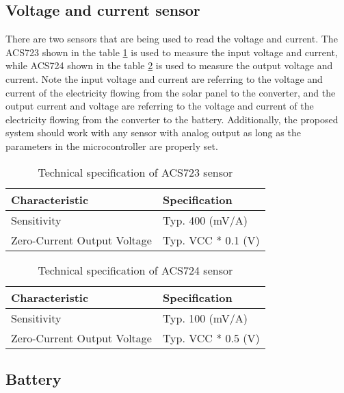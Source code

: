 \documentclass[../thesis.tex]{subfiles}
\begin{document}
\subsection{Voltage and current sensor}

There are two sensors that are being used to read the voltage and current. The ACS723 shown in the table \ref{tab:acs723} is used to measure the input voltage and current, while ACS724 shown in the table \ref{tab:acs724} is used to measure the output voltage and current. Note the input voltage and current are referring to the voltage and current of the electricity flowing from the solar panel to the converter, and the output current and voltage are referring to the voltage and current of the electricity flowing from the converter to the battery. Additionally, the proposed system should work with any sensor with analog output as long as the parameters in the microcontroller are properly set.

\begin{table}[h!]
	\begin{center}
		\caption{Technical specification of ACS723 sensor}
		\label{tab:acs723}
		\begin{tabular}{l|l}
			\toprule
			\textbf{Characteristic} & \textbf{Specification}\\
			\midrule
			Sensitivity & Typ. 400 (mV/A)\\
			Zero-Current Output Voltage & Typ. VCC * 0.1 (V)\\
			\bottomrule
		\end{tabular}
	\end{center}
\end{table}

\begin{table}[h!]
	\begin{center}
		\caption{Technical specification of ACS724 sensor}
		\label{tab:acs724}
		\begin{tabular}{l|l}
			\toprule
			\textbf{Characteristic} & \textbf{Specification}\\
			\midrule
			Sensitivity & Typ. 100 (mV/A)\\
			Zero-Current Output Voltage & Typ. VCC * 0.5 (V)\\
			\bottomrule
		\end{tabular}
	\end{center}
\end{table}

\newpage
\subsection{Battery}
\end{document}
